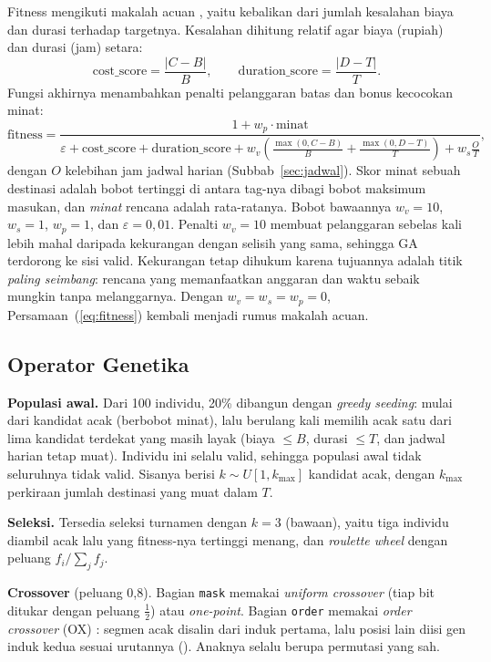 Fitness mengikuti makalah acuan \cite{qomariyah2021}, yaitu kebalikan dari jumlah kesalahan biaya dan durasi terhadap targetnya. Kesalahan dihitung relatif agar biaya (rupiah) dan durasi (jam) setara:
\begin{equation}
\text{cost\_score} = \frac{|C - B|}{B}, \qquad \text{duration\_score} = \frac{|D - T|}{T}.
\end{equation}
Fungsi akhirnya menambahkan penalti pelanggaran batas dan bonus kecocokan minat:
\begin{equation}
\text{fitness} = \frac{1 + w_p \cdot \text{minat}}{\varepsilon + \text{cost\_score} + \text{duration\_score} + w_v\!\left(\frac{\max(0, C-B)}{B} + \frac{\max(0, D-T)}{T}\right) + w_s \frac{O}{T}},
\label{eq:fitness}
\end{equation}
dengan $O$ kelebihan jam jadwal harian (Subbab~\ref{sec:jadwal}). Skor minat sebuah destinasi adalah bobot tertinggi di antara tag-nya dibagi bobot maksimum masukan, dan \textit{minat} rencana adalah rata-ratanya. Bobot bawaannya $w_v = 10$, $w_s = 1$, $w_p = 1$, dan $\varepsilon = 0{,}01$. Penalti $w_v = 10$ membuat pelanggaran sebelas kali lebih mahal daripada kekurangan dengan selisih yang sama, sehingga GA terdorong ke sisi valid. Kekurangan tetap dihukum karena tujuannya adalah titik \emph{paling seimbang}: rencana yang memanfaatkan anggaran dan waktu sebaik mungkin tanpa melanggarnya. Dengan $w_v = w_s = w_p = 0$, Persamaan~(\ref{eq:fitness}) kembali menjadi rumus makalah acuan.

\subsection{Operator Genetika}
\label{sec:operator}

\textbf{Populasi awal.} Dari 100 individu, 20\% dibangun dengan \textit{greedy seeding}: mulai dari kandidat acak (berbobot minat), lalu berulang kali memilih acak satu dari lima kandidat terdekat yang masih layak (biaya $\le B$, durasi $\le T$, dan jadwal harian tetap muat). Individu ini selalu valid, sehingga populasi awal tidak seluruhnya tidak valid. Sisanya berisi $k \sim U[1, k_{\max}]$ kandidat acak, dengan $k_{\max}$ perkiraan jumlah destinasi yang muat dalam $T$.

\textbf{Seleksi.} Tersedia seleksi turnamen dengan $k = 3$ (bawaan), yaitu tiga individu diambil acak lalu yang fitness-nya tertinggi menang, dan \textit{roulette wheel} dengan peluang $f_i / \sum_j f_j$.

\textbf{Crossover} (peluang 0,8). Bagian \texttt{mask} memakai \textit{uniform crossover} (tiap bit ditukar dengan peluang $\tfrac12$) atau \textit{one-point}. Bagian \texttt{order} memakai \textit{order crossover} (OX) \cite{davis1985}: segmen acak disalin dari induk pertama, lalu posisi lain diisi gen induk kedua sesuai urutannya (). Anaknya selalu berupa permutasi yang sah.

